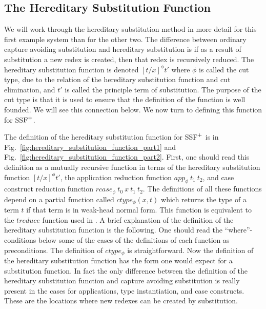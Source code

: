 \subsection{The Hereditary Substitution Function}
\label{sec:the_hereditary_substitution_function_ssfp}
We will work through the hereditary substitution method in more detail
for this first example system than for the other two.  The difference
between ordinary capture avoiding substitution and hereditary substitution
is if as a result of substitution a new redex is created, then
that redex is recursively reduced.  The hereditary substitution
function is denoted $[t/x]^\phi t'$ where $\phi$ is called the cut
type, due to the relation of the hereditary substitution function and
cut elimination, and $t'$ is called the principle term of
substitution.  The purpose of the cut type is that it is used to
ensure that the definition of the function is well founded.  We will
see this connection below.  We now turn to defining this function for
SS$\mbox{F}^{+}$.

The definition of the hereditary substitution function for SS$\mbox{F}^{+}$ is
in Fig.~\ref{fig:hereditary_substitution_function_part1} and
Fig.~\ref{fig:hereditary_substitution_function_part2}.  First, one
should read this definition as a mutually recursive function in terms
of the hereditary substitution function $[t/x]^\phi t'$,
the application reduction function $app_\phi\ t_1\ t_2$, and 
case construct reduction function $rcase_\phi\ t_0\ x\ t_1\ t_2$.  The
definitions of all these functions depend on a partial function called
$ctype_\phi(x, t)$ which returns the type of a term $t$ if that term
is in weak-head normal form.  This function is equivalent to the
$treduce$ function used in \cite{Watkins:2004}.
%
A brief explanation of the definition of the hereditary substitution
function is the following.  One should read the
``where''-conditions below some of the cases of the definitions of
each function as preconditions.  The definition of $ctype_\phi$ is
straightforward.  Now the definition of the hereditary substitution
function has the form one would expect for a substitution function.
In fact the only difference between the definition of the hereditary
substitution function and capture avoiding substitution is really
present in the cases for applications, type instantiation, and case
constructs.  These are the locations where new redexes can be created
by substitution.  


